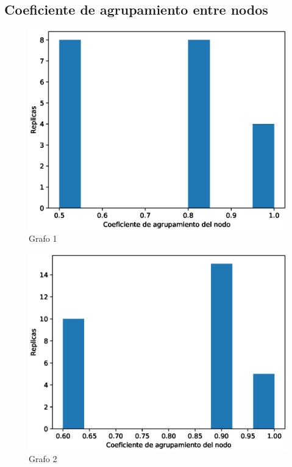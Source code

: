 \documentclass{article}
\begin{document}
\subsection{Coeficiente de agrupamiento entre nodos}
\begin{figure}[H]
    \includegraphics[scale=0.6]{hist-grado-1}
    \caption{Grafo 1}
    \label{fig:matriz}
\end{figure}
\begin{figure}[H]
    \includegraphics[scale=0.6]{hist-grado-2}
    \caption{Grafo 2}
    \label{fig:matriz}
\end{figure}
\end{document}
